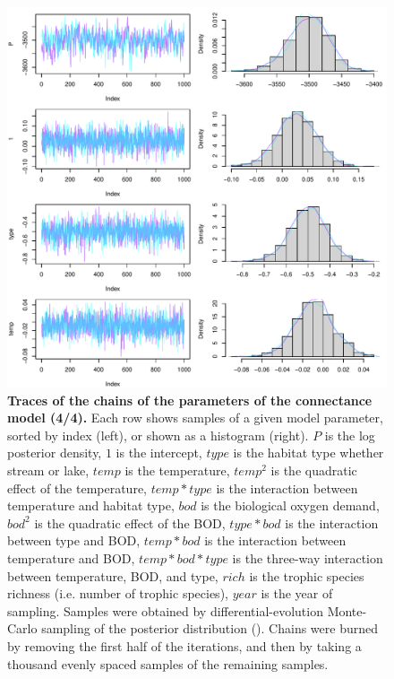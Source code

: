 \documentclass[11pt, oneside]{article}
\begin{document}
\begin{figure}[H]
\begin{center}
\includegraphics[page=4, width=1\linewidth]{b0_6_2/out_con/fig_tracePlot_beta.pdf}
\caption{
    \textbf{Traces of the chains of the parameters of the connectance model (4/4).}
    Each row shows samples of a given model parameter, sorted by index (left), or shown as a histogram (right).
    $P$ is the log posterior density, $1$ is the intercept, $type$ is the habitat type whether stream or lake, $temp$ is the temperature, $temp^2$ is the quadratic effect of the temperature, $temp * type$ is the interaction between temperature and habitat type, $bod$ is the biological oxygen demand, $bod^2$ is the quadratic effect of the BOD, $type * bod$ is the interaction between type and BOD, $temp * bod$ is the interaction between temperature and BOD, $temp * bod * type$ is the three-way interaction between temperature, BOD, and type, $rich$ is the trophic species richness (i.e. number of trophic species), $year$ is the year of sampling.
    Samples were obtained by differential-evolution Monte-Carlo sampling of the posterior distribution (\cite{TerBraak2006}).
    Chains were burned by removing the first half of the iterations, and then by taking a thousand evenly spaced samples of the remaining samples.
} 
\end{center}
\end{figure}
\end{document}
